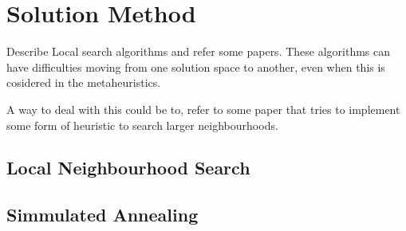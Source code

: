 \documentclass[../main.tex]{subfiles}
\begin{document}
                                                
\chapter{Solution Method}
Describe Local search algorithms and refer some papers. 
These algorithms can have difficulties moving from one solution space to another, even when this is cosidered in the metaheuristics. \par
A way to deal with this could be to, refer to some paper that tries to implement some form of heuristic to search larger neighbourhoods.

\section{Local Neighbourhood Search}
\label{sec:lns}

\section{Simmulated Annealing}
\label{sec:sima}

\biblio
\end{document}
